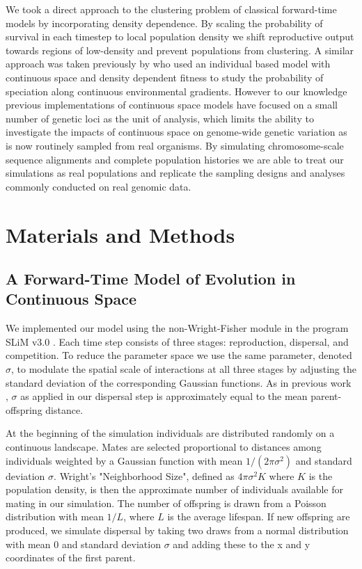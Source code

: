 \documentclass[9pt,twocolumn,twoside,lineno]{gsajnl}
\begin{document}
We took a direct approach to the clustering problem of classical forward-time models by incorporating density dependence. By scaling the probability of survival in each timestep to local population density we shift reproductive output towards regions of low-density and prevent populations from clustering. A similar approach was taken previously by \citep{Doebeli2003} who used an individual based model with continuous space and density dependent fitness to study the probability of speciation along continuous environmental gradients. However to our knowledge previous implementations of continuous space models have focused on a small number of genetic loci as the unit of analysis, which limits the ability to investigate the impacts of continuous space on genome-wide genetic variation as is now routinely sampled from real organisms. By simulating chromosome-scale sequence alignments and complete population histories we are able to treat our simulations as real populations and replicate the sampling designs and analyses commonly conducted on real genomic data.

\section{Materials and Methods}
\label{sec:materials:methods}

\subsection{A Forward-Time Model of Evolution in Continuous Space}

We implemented our model using the non-Wright-Fisher module in the program SLiM v3.0 \citep{Haller2019}. Each time step consists of three stages: reproduction, dispersal, and competition. To reduce the parameter space we use the same parameter, denoted $\sigma$, to modulate the spatial scale of interactions at all three stages by adjusting the standard deviation of the corresponding Gaussian functions. As in previous work \citep{Wright1943,Ringbauer2017}, $\sigma$ as applied in our dispersal step is approximately equal to the mean parent-offspring distance.  

At the beginning of the simulation individuals are distributed randomly on a continuous landscape. Mates are selected proportional to distances among individuals weighted by a Gaussian function with mean $1/(2\pi\sigma^2)$ and standard deviation $\sigma$. Wright's \cite{Wright1943} "Neighborhood Size", defined as $4\pi\sigma^2 K$ where $K$ is the population density, is then the approximate number of individuals available for mating in our simulation. The number of offspring is drawn from a Poisson distribution with mean $1/L$, where $L$ is the average lifespan. If new offspring are produced, we simulate dispersal by taking two draws from a normal distribution with mean 0 and standard deviation $\sigma$ and adding these to the x and y coordinates of the first parent. 
\end{document}
